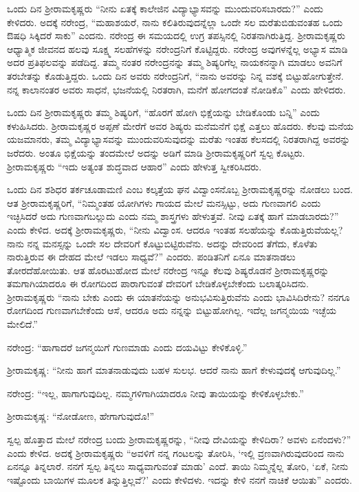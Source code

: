 ಒಂದು ದಿನ ಶ‍್ರೀರಾಮಕೃಷ್ಣರು “ನೀನು ಏತಕ್ಕೆ ಕಾಲೇಜಿನ ವಿದ್ಯಾಭ್ಯಾಸವನ್ನು ಮುಂದುವರಿಸಬಾರದು?” ಎಂದು ಕೇಳಿದರು. ಅದಕ್ಕೆ ನರೇಂದ್ರ, “ಮಹಾಶಯರೆ, ನಾನು ಕಲಿತಿರುವುದನ್ನೆಲ್ಲಾ ಒಂದೇ ಸಲ ಮರೆತುಬಿಡುವಂತಹ ಒಂದು ಔಷಧಿ ಸಿಕ್ಕಿದರೆ ಸಾಕು” ಎಂದನು. ನರೇಂದ್ರ ಈ ಸಮಯದಲ್ಲಿ ಉಗ್ರ ತಪಸ್ಸಿನಲ್ಲಿ ನಿರತನಾಗಿರುತ್ತಿದ್ದ. ಶ‍್ರೀರಾಮಕೃಷ್ಣರು ಆಧ್ಯಾತ್ಮಿಕ ಜೀವನದ ಹಲವು ಸೂಕ್ಷ್ಮ ಸಲಹೆಗಳನ್ನು ನರೇಂದ್ರನಿಗೆ ಕೊಟ್ಟಿದ್ದರು. ನರೇಂದ್ರ ಅವುಗಳನ್ನೆಲ್ಲ ಅಭ್ಯಾಸ ಮಾಡಿ ಅದರ ಪ್ರತಿಫಲವನ್ನು ಪಡೆದಿದ್ದ. ತಮ್ಮ ನಂತರ ನರೇಂದ್ರನನ್ನು ತಮ್ಮ ಶಿಷ್ಯರಿಗೆಲ್ಲ ನಾಯಕನನ್ನಾಗಿ ಮಾಡಲು ಅವನಿಗೆ ತರಬೇತನ್ನು ಕೊಡುತ್ತಿದ್ದರು. ಒಂದು ದಿನ ಅವರು ನರೇಂದ್ರನಿಗೆ, “ನಾನು ಅವರನ್ನು ನಿನ್ನ ವಶಕ್ಕೆ ಬಿಟ್ಟುಹೋಗುತ್ತೇನೆ. ನನ್ನ ಕಾಲಾನಂತರ ಅವರು ಸಾಧನೆ, ಭಜನೆಯಲ್ಲಿ ನಿರತರಾಗಿ, ಮನೆಗೆ ಹೋಗದಂತೆ ನೋಡಿಕೊ” ಎಂದು ಹೇಳಿದರು.

ಒಂದು ದಿನ ಶ‍್ರೀರಾಮಕೃಷ್ಣರು ತಮ್ಮ ಶಿಷ್ಯರಿಗೆ, “ಹೊರಗೆ ಹೋಗಿ ಭಿಕ್ಷೆಯನ್ನು ಬೇಡಿಕೊಂಡು ಬನ್ನಿ” ಎಂದು ಕಳುಹಿಸಿದರು. ಶ‍್ರೀರಾಮಕೃಷ್ಣರ ಅಪ್ಪಣೆ ಮೇರೆಗೆ ಅವರ ಶಿಷ್ಯರು ಮನೆಮನೆಗೆ ಭಿಕ್ಷೆ ಎತ್ತಲು ಹೊದರು. ಕೆಲವು ಮನೆಯ ಯಜಮಾನರು, ತಮ್ಮ ವಿದ್ಯಾಭ್ಯಾಸವನ್ನು ಮುಂದುವರಿಸುವುದನ್ನು ಮರೆತು ಇಂತಹ ಕೆಲಸದಲ್ಲಿ ನಿರತರಾಗಿದ್ದ ಅವರನ್ನು ಜರೆದರು. ಅಂತೂ ಭಿಕ್ಷೆಯನ್ನು ತಂದಮೇಲೆ ಅದನ್ನು ಅಡಿಗೆ ಮಾಡಿ ಶ‍್ರೀರಾಮಕೃಷ್ಣರಿಗೆ ಸ್ವಲ್ಪ ಕೊಟ್ಟರು. ಶ‍್ರೀರಾಮಕೃಷ್ಣರು “ಇದು ಅತ್ಯಂತ ಶುದ್ಧವಾದ ಆಹಾರ” ಎಂದು ಹೇಳುತ್ತ ಸ್ವೀಕರಿಸಿದರು.

ಒಂದು ದಿನ ಶಶಿಧರ ತರ್ಕಚೂಡಾಮಣಿ ಎಂಬ ಕಲ್ಕತ್ತೆಯ ಘನ ವಿದ್ವಾಂಸನೊಬ್ಬ ಶ‍್ರೀರಾಮಕೃಷ್ಣರನ್ನು ನೋಡಲು ಬಂದ. ಆತ ಶ‍್ರೀರಾಮಕೃಷ್ಣರಿಗೆ, “ನಿಮ್ಮಂತಹ ಯೋಗಿಗಳು ಗಾಯದ ಮೇಲೆ ಮನಸ್ಸಿಟ್ಟು, ಅದು ಗುಣವಾಗಲಿ ಎಂದು ಇಚ್ಛಿಸಿದರೆ ಅದು ಗುಣವಾಗಬಲ್ಲುದು ಎಂದು ನಮ್ಮ ಶಾಸ್ತ್ರಗಳು ಹೇಳುತ್ತವೆ. ನೀವು ಏತಕ್ಕೆ ಹಾಗೆ ಮಾಡಬಾರದು?” ಎಂದು ಕೇಳಿದ. ಅದಕ್ಕೆ ಶ‍್ರೀರಾಮಕೃಷ್ಣರು, “ನೀನು ವಿದ್ವಾಂಸ. ಆದರೂ ಇಂತಹ ಸಲಹೆಯನ್ನು ಕೊಡುತ್ತಿರುವೆಯಲ್ಲ? ನಾನು ನನ್ನ ಮನಸ್ಸನ್ನು ಒಂದೇ ಸಲ ದೇವರಿಗೆ ಕೊಟ್ಟುಬಿಟ್ಟಿರುವೆನು. ಅದನ್ನು ದೇವರಿಂದ ತೆಗೆದು, ಕೊಳೆತು ನಾರುತ್ತಿರುವ ಈ ದೇಹದ ಮೇಲೆ ಇಡಲು ಸಾಧ್ಯವೆ?” ಎಂದರು. ಪಂಡಿತನಿಗೆ ಏನೂ ಮಾತನಾಡಲು ತೋರದೆಹೋಯಿತು. ಆತ ಹೊರಟುಹೋದ ಮೇಲೆ ನರೇಂದ್ರ ಇನ್ನೂ ಕೆಲವು ಶಿಷ್ಯರೊಡನೆ ಶ‍್ರೀರಾಮಕೃಷ್ಣರನ್ನು ತಮಗಾಗಿಯಾದರೂ ಈ ರೋಗದಿಂದ ಪಾರಾಗುವಂತೆ ದೇವರಿಗೆ ಬೇಡಿಕೊಳ್ಳಬೇಕೆಂದು ಬಲಾತ್ಕರಿಸಿದನು. ಶ‍್ರೀರಾಮಕೃಷ್ಣರು “ನಾನು ಬೇಕು ಎಂದು ಈ ಯಾತನೆಯನ್ನು ಅನುಭವಿಸುತ್ತಿರುವೆನು ಎಂದು ಭಾವಿಸಿದಿರೇನು? ನನಗೂ ರೋಗದಿಂದ ಗುಣವಾಗಬೇಕೆಂದು ಆಸೆ, ಆದರೂ ಅದು ನನ್ನನ್ನು ಬಿಟ್ಟುಹೋಗಿಲ್ಲ. ಇದೆಲ್ಲ ಜಗನ್ಮಯಿಯ ಇಚ್ಛೆಯ ಮೇಲಿದೆ.”

ನರೇಂದ್ರ: “ಹಾಗಾದರೆ ಜಗನ್ಮಯಿಗೆ ಗುಣಮಾಡು ಎಂದು ದಯವಿಟ್ಟು ಕೇಳಿಕೊಳ್ಳಿ.”

ಶ‍್ರೀರಾಮಕೃಷ್ಣ: “ನೀನು ಹಾಗೆ ಮಾತನಾಡುವುದು ಬಹಳ ಸುಲಭ. ಆದರೆ ನಾನು ಹಾಗೆ ಕೇಳುವುದಕ್ಕೆ ಆಗುವುದಿಲ್ಲ.”

ನರೇಂದ್ರ: “ಇಲ್ಲ, ಹಾಗಾಗುವುದಿಲ್ಲ. ನಮ್ಮಗಳಿಗಾಗಿಯಾದರೂ ನೀವು ತಾಯಿಯನ್ನು ಕೇಳಿಕೊಳ್ಳಬೇಕು.”

ಶ‍್ರೀರಾಮಕೃಷ್ಣ: “ನೋಡೋಣ, ಹೇಗಾಗುವುದೊ!”

ಸ್ವಲ್ಪ ಹೊತ್ತಾದ ಮೇಲೆ ನರೇಂದ್ರ ಬಂದು ಶ‍್ರೀರಾಮಕೃಷ್ಣರನ್ನು, “ನೀವು ದೇವಿಯನ್ನು ಕೇಳಿದಿರಾ? ಅವಳು ಏನೆಂದಳು?” ಎಂದು ಕೇಳಿದ. ಅದಕ್ಕೆ ಶ‍್ರೀರಾಮಕೃಷ್ಣರು “ಅವಳಿಗೆ ನನ್ನ ಗಂಟಲನ್ನು ತೋರಿಸಿ, ‘ಇಲ್ಲಿ ವ್ರಣವಾಗಿರುವುದರಿಂದ ನಾನು ಏನನ್ನೂ ತಿನ್ನಲಾರೆ. ನನಗೆ ಸ್ವಲ್ಪ ತಿನ್ನಲು ಸಾಧ್ಯವಾಗುವಂತೆ ಮಾಡು’ ಎಂದೆ. ತಾಯಿ ನಿಮ್ಮನ್ನೆಲ್ಲ ತೋರಿ, ‘ಏಕೆ, ನೀನು ಇಷ್ಟೊಂದು ಬಾಯಿಗಳ ಮೂಲಕ ತಿನ್ನುತ್ತಿಲ್ಲವೆ?’ ಎಂದು ಕೇಳಿದಳು. ಇದನ್ನು ಕೇಳಿ ನನಗೆ ನಾಚಿಕೆ ಆಯಿತು” ಎಂದರು.


